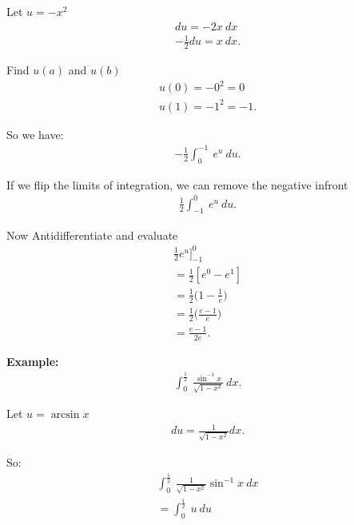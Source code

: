 \documentclass{report}
\begin{document}
  \bigbreak \noindent \bigbreak \noindent
  Let $u= -x^{2} $
  \begin{align*}
    du = -2x \ dx \\
    -\frac{1}{2}du= x\ dx
  .\end{align*}

  \bigbreak \noindent \bigbreak \noindent
  Find $u(a)$ and $u(b) $
  \begin{align*}
    u(0) = -0^{2} = 0 \\
    u(1) = -1^{2} = -1
  .\end{align*}

  \bigbreak \noindent \bigbreak \noindent
  So we have:
  \begin{align*}
    -\frac{1}{2}\int_{0}^{-1}\ e^{u}\ du
  .\end{align*}

  \bigbreak \noindent \bigbreak \noindent
  If we flip the limits of integration, we can remove the negative infront
  \begin{align*}
    \frac{1}{2}\int_{-1}^{0}\ e^{u}\ du
  .\end{align*}

  \bigbreak \noindent \bigbreak \noindent
  Now Antidifferentiate and evaluate
  \begin{align*}
    \frac{1}{2}e^{u}\bigg]_{-1}^{0} \\
    = \frac{1}{2}[e^{0}-e^{1}] \\
    = \frac{1}{2}\bigg(1-\frac{1}{e}\bigg) \\
    = \frac{1}{2}\bigg(\frac{e-1}{e}\bigg) \\
    \boxed{= \frac{e-1}{2e}}
  .\end{align*}

  \bigbreak \noindent 
  \begin{mdframed}
    \textbf{Example: }
    \begin{align*}
      \int_{0}^{\frac{1}{2}}\ \frac{\sin^{-1}{x}}{\sqrt{1-x^{2}}}\ dx
    .\end{align*}
  \end{mdframed}

  \bigbreak \noindent \bigbreak \noindent
  Let $u=\arcsin{x} $
  \begin{align*}
    du = \frac{1}{\sqrt{1-x^{2}}}dx
  .\end{align*}

  \bigbreak \noindent
  So:
  \begin{align*}
    \int_{0}^{\frac{1}{2}}\ \frac{1}{\sqrt{1-x^{2}}}\sin^{-1}{x}\ dx \\
    = \int_{0}^{\frac{1}{2}}\ u\ du
  \end{align*}
\end{document}
